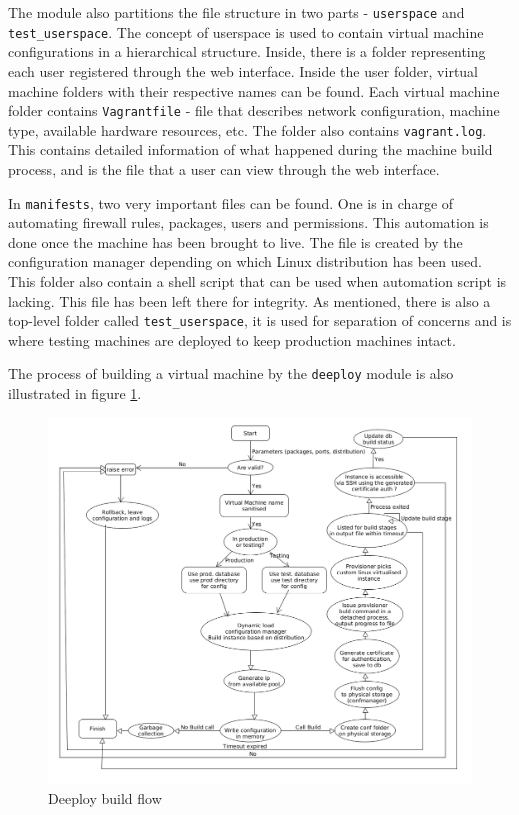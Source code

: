 \documentclass{article}
\begin{document}
The module also partitions the file structure in two parts - \texttt{userspace} and  \texttt{test\_userspace}. The concept of userspace is used to contain virtual machine configurations in a hierarchical structure. Inside, there is a folder representing each user registered through the web interface. Inside the user folder, virtual machine folders with their respective names can be found. Each virtual machine folder contains \texttt{Vagrantfile} - file that describes network configuration, machine type, available hardware resources, etc. The folder also contains \texttt{vagrant.log}. This contains detailed information of what happened during the machine build process, and is the file that a user can view through the web interface.

In \texttt{manifests}, two very important files can be found. One is in charge of automating firewall rules, packages, users and permissions. This automation is done once the machine has been brought to live. The file is created by the configuration manager depending on which Linux distribution has been used. This folder also contain a shell script that can be used when automation script is lacking. This file has been left there for integrity.
As mentioned, there is also a top-level folder called \texttt{test\_userspace}, it is used for separation of concerns and is where testing machines are deployed to keep production machines intact.

The process of building a virtual machine by the \texttt{deeploy} module is also illustrated in figure \ref{fig:deeploy-build-flow}.

\begin{figure}[h!]
	\vspace{0.5cm}
	\includegraphics[width=12cm]{build-flow.png}
	\vspace{0.5cm}
	\caption{Deeploy build flow}
	\label{fig:deeploy-build-flow}
\end{figure}
\end{document}
